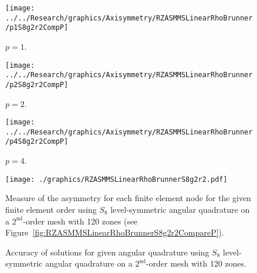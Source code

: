 \documentclass[12pt]{article}
\begin{document}
\begin{sidewaysfigure}[!htb]
\centering
\begin{subfigure}{0.33\textwidth}
\texttt{[image: ../../Research/graphics/Axisymmetry/RZASMMSLinearRhoBrunner/p1S8g2r2CompP]}
\caption{$p=1$.}
\end{subfigure}%
\begin{subfigure}{0.33\textwidth}
\texttt{[image: ../../Research/graphics/Axisymmetry/RZASMMSLinearRhoBrunner/p2S8g2r2CompP]}
\caption{$p=2$.}
\end{subfigure}%
\begin{subfigure}{0.33\textwidth}
\texttt{[image: ../../Research/graphics/Axisymmetry/RZASMMSLinearRhoBrunner/p4S8g2r2CompP]}
\caption{$p=4$.}
\end{subfigure}
\caption{Relative asymmetry for $p=\{1,2,4\}$ finite elements on a $2^\text{nd}$-order mesh for $S_8$ level-symmetric angular quadrature.}
\label{fig:RZASMMSLinearRhoBrunnerS8g2r2CompareP}
\end{sidewaysfigure}

\begin{figure}[!htb]
\centering
\texttt{[image: ./graphics/RZASMMSLinearRhoBrunnerS8g2r2.pdf]}
\caption{Measure of the asymmetry for each finite element node for the given finite element order using $S_8$ level-symmetric angular quadrature on a $2^\text{nd}$-order mesh with 120 zones (see Figure~\ref{fig:RZASMMSLinearRhoBrunnerS8g2r2CompareP}).}
\label{fig:RZASMMSLinearRhoBrunnerS8g2r2Nodes}
\end{figure}

\begin{figure}[!htb]
\centering
{}
\caption{Accuracy of solutions for given angular quadrature using $S_8$ level-symmetric angular quadrature on a $2^\text{nd}$-order mesh with 120 zones.}
\label{fig:RZASMMSLinearRhoBrunnerS8g2r2Accuracy}
\end{figure}
\end{document}
